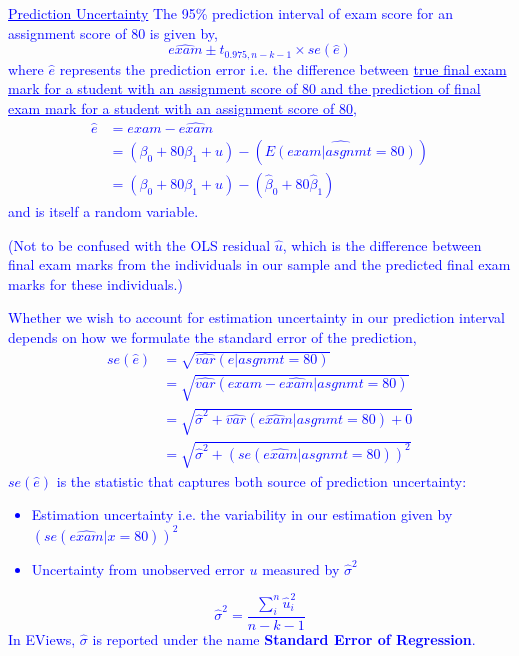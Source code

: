 \documentclass[12pt]{report}
\newenvironment{blueframed}[1][blue]
{\def\FrameCommand{\fboxsep=\FrameSep\fcolorbox{#1}{white}}%
	\MakeFramed {\advance\hsize-\width \FrameRestore}}
{\endMakeFramed}
\begin{document}
\newpage
\justify
\begin{blueframed}
	\textcolor{blue}{\underline{Prediction Uncertainty}}
	\vspace{-\baselineskip}
	\justify
	\noindent \textcolor{blue}
	{
		The 95\% prediction interval of exam score for an assignment score of 80 is given by,
		$$\widehat{exam} \pm t_{0.975,n-k-1} \times se(\hat{e})$$
		where $\hat{e}$ represents the prediction error i.e. the difference between \uline{true final exam mark for a student with an assignment score of 80 and the prediction of final exam mark for a student with an assignment score of 80},
		\begin{align*}
		\hat{e} &= exam - \widehat{exam} \\
		&= (\beta_0 + 80\beta_1 + u) - (\widehat{E(exam|asgnmt=80)}) \\
		&= (\beta_0 + 80\beta_1 + u) - (\hat{\beta}_0 + 80\hat{\beta}_1)
		\end{align*}
		and is itself a random variable.
	}
	
	\noindent \textcolor{blue}
	{
		(Not to be confused with the OLS residual $\hat{u}$, which is the difference between final exam marks from the individuals in our sample and the predicted final exam marks for these individuals.)
	}
	
	\noindent \textcolor{blue}
	{
		Whether we wish to account for estimation uncertainty in our prediction interval depends on how we formulate the standard error of the prediction,
		\begin{align*}
		se(\hat{e}) &= \sqrt{\widehat{var}({\hat{e}|asgnmt=80})} \\
		&= \sqrt{\widehat{var}({exam-\hat{exam}|asgnmt=80})} \\
		&= \sqrt{\hat{\sigma}^2 + \widehat{var}({\hat{exam}|asgnmt=80}) + 0} \\
		&= \sqrt{\hat{\sigma}^2 + (se(\hat{exam}|asgnmt=80))^2}
		\end{align*}
		$se(\hat{e})$ is the statistic that captures both source of prediction uncertainty: \begin{itemize}
			\item Estimation uncertainty i.e. the variability in our estimation given by $(se(\hat{exam}|x=80))^2$
			\item Uncertainty from  unobserved error $u$ measured by $\hat{\sigma}^2$
		\end{itemize} $$\hat{\sigma}^2 = \dfrac{\sum_{i}^{n}\hat{u}_{i}^{2}}{n-k-1}$$
	In EViews, $\hat{\sigma}$ is reported under the name \textbf{Standard Error of Regression}.
	}
\end{blueframed}
\end{document}
